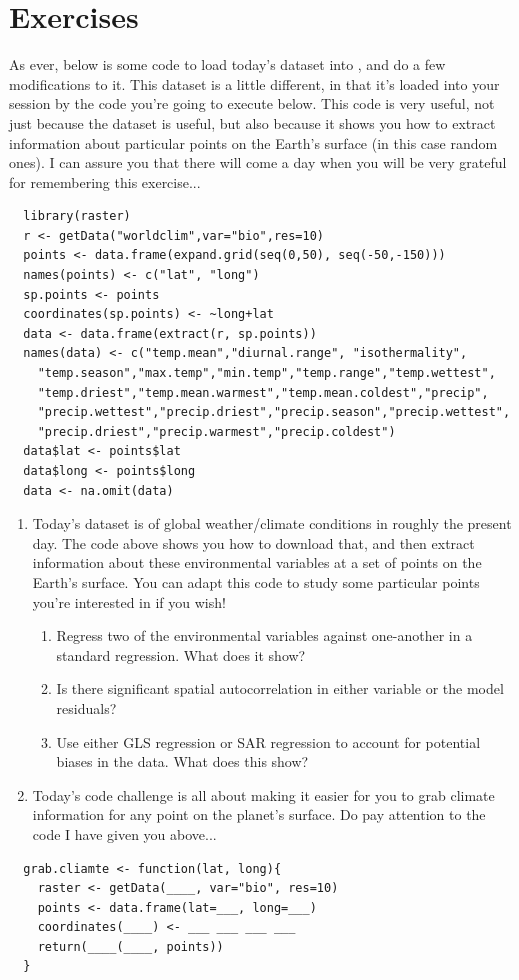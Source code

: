 \section{Exercises}
As ever, below is some code to load today's dataset into \R, and do a
few modifications to it. This dataset is a little different, in that
it's loaded into your \R session by the code you're going to execute
below. This code is very useful, not just because the dataset is
useful, but also because it shows you how to extract information about
particular points on the Earth's surface (in this case random ones). I
can assure you that there will come a day when you will be very
grateful for remembering this exercise...

\begin{verbatim}
  library(raster)
  r <- getData("worldclim",var="bio",res=10)
  points <- data.frame(expand.grid(seq(0,50), seq(-50,-150)))
  names(points) <- c("lat", "long")
  sp.points <- points
  coordinates(sp.points) <- ~long+lat
  data <- data.frame(extract(r, sp.points))
  names(data) <- c("temp.mean","diurnal.range", "isothermality",
    "temp.season","max.temp","min.temp","temp.range","temp.wettest",
    "temp.driest","temp.mean.warmest","temp.mean.coldest","precip",
    "precip.wettest","precip.driest","precip.season","precip.wettest",
    "precip.driest","precip.warmest","precip.coldest")
  data$lat <- points$lat
  data$long <- points$long
  data <- na.omit(data)
\end{verbatim}

\begin{enumerate}
\item Today's dataset is of global weather/climate conditions in
  roughly the present day. The code above shows you how to download
  that, and then extract information about these environmental
  variables at a set of points on the Earth's surface. You can adapt
  this code to study some particular points you're interested in if
  you wish!
  \begin{enumerate}
  \item Regress two of the environmental variables against one-another
    in a standard regression. What does it show?
  \item Is there significant spatial autocorrelation in either
    variable or the model residuals?
  \item Use either GLS regression or SAR regression to account for
    potential biases in the data. What does this show?
  \end{enumerate}

\item Today's code challenge is all about making it easier for you to
  grab climate information for any point on the planet's surface. Do
  pay attention to the code I have given you above...
\end{enumerate}
\begin{verbatim}
  grab.cliamte <- function(lat, long){
    raster <- getData(____, var="bio", res=10)
    points <- data.frame(lat=___, long=___)
    coordinates(____) <- ___ ___ ___ ___
    return(____(____, points))
  }
\end{verbatim}
